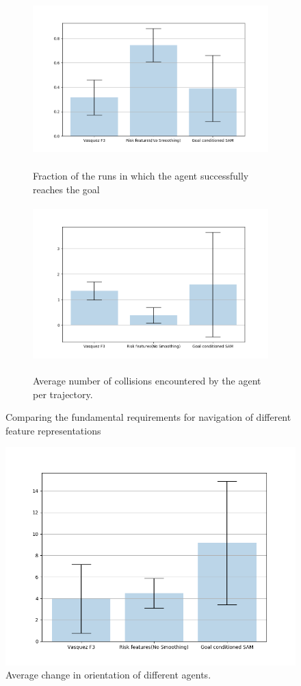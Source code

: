 \begin{figure}[!htbp]
	\begin{subfigure}{.5\textwidth}
		\centering
		\includegraphics[width=\linewidth, height=6cm]{plots/inter_IRL/goal_reached.png}
		\label{fig:inter_IRL-goal_reached}
		\caption{Fraction of the runs in which the agent successfully reaches the goal}
	\end{subfigure}
	\begin{subfigure}{.5\textwidth}
		\centering
		\includegraphics[width=\linewidth, height=6cm]{plots/inter_IRL/count_collisions.png}
		\label{fig:inter_IRL-collision_counts}
		\caption{Average number of collisions encountered by the agent per trajectory.}
	\end{subfigure}
	\caption{Comparing the fundamental requirements for navigation of different feature representations }
\end{figure}

\begin{figure}[htbp]
	\centering
	\includegraphics[width=0.7\linewidth]{plots/inter_IRL/avg_trajectory_smoothness.png}
	\caption{Average change in orientation of different agents.}
	\label{fig:inter_IRL-change_in_orientation_avg}
\end{figure}

